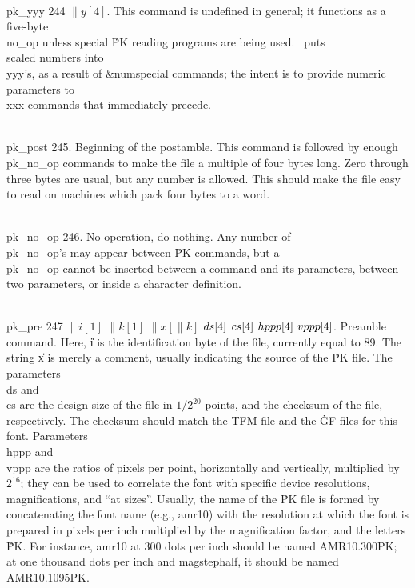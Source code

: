 \yskip\hang\\{pk\_yyy} 244 $\|y[4]$.  This command is undefined in general; it
functions as a five-byte \\{no\_op} unless special \.{PK} reading programs
are being used.  \MF\ puts \\{scaled} numbers into \\{yyy}'s, as a result of
\&{numspecial} commands; the intent is to provide numeric parameters to
\\{xxx} commands that immediately precede.

\yskip\hang\\{pk\_post} 245.  Beginning of the postamble.  This command is
followed by enough \\{pk\_no\_op} commands to make the file a multiple
of four bytes long.  Zero through three bytes are usual, but any number
is allowed.
This should make the file easy to read on machines which pack four bytes to
a word.

\yskip\hang\\{pk\_no\_op} 246.  No operation, do nothing.  Any number of
\\{pk\_no\_op}'s may appear between \.{PK} commands, but a \\{pk\_no\_op}
cannot be
inserted between a command and its parameters, between two parameters, or
inside a character definition.

\yskip\hang\\{pk\_pre} 247 $\|i[1]$ $\|k[1]$ $\|x[\|k]$ $\\{ds}[4]$ $\\{cs}[4]$
$\\{hppp}[4]$
$\\{vppp}[4]$.  Preamble command.  Here, \|i is the identification byte of the
file, currently equal to 89.  The string \|x is merely a comment, usually
indicating the source of the \.{PK} file.  The parameters \\{ds} and \\{cs} are
the design size of the file in $1/2^{20}$ points, and the checksum of the
file, respectively.  The checksum should match the \.{TFM} file and the
\.{GF} files for this font.  Parameters \\{hppp} and \\{vppp} are the ratios
of pixels per point, horizontally and vertically, multiplied by $2^{16}$; they
can be used to correlate the font with specific device resolutions,
magnifications, and ``at sizes''.  Usually, the name of the \.{PK} file is
formed by concatenating the font name (e.g., amr10) with the resolution at
which the font is prepared in pixels per inch multiplied by the magnification
factor, and the letters \.{PK}.  For instance, amr10 at 300 dots per inch
should be named AMR10.300PK; at one thousand dots per inch and magstephalf,
it should be named AMR10.1095PK.

